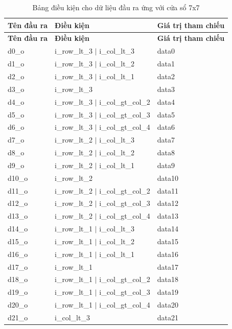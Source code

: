 \begin{longtable}{|p{3cm}|p{8cm}|p{4cm}|}
			\caption{Bảng điều kiện cho dữ liệu đầu ra ứng với cửa sổ 7x7} 
	\hline
	\rowcolor{gray!30}
	\textbf{Tên đầu ra} & \textbf{Điều kiện} & \textbf{Giá trị tham chiếu} \\
	\hline
	\endfirsthead
	
	\hline
	\rowcolor{gray!30}
	\textbf{Tên đầu ra} & \textbf{Điều kiện} & \textbf{Giá trị tham chiếu} \\
	\hline
	\endhead
	d0\_o & i\_row\_lt\_3 $\vert$ i\_col\_lt\_3 & data0 \\
	d1\_o & i\_row\_lt\_3 $\vert$ i\_col\_lt\_2 & data1 \\
	d2\_o & i\_row\_lt\_3 $\vert$ i\_col\_lt\_1 & data2 \\
	d3\_o & i\_row\_lt\_3 & data3 \\
	d4\_o & i\_row\_lt\_3 $\vert$ i\_col\_gt\_col\_2 & data4 \\
	d5\_o & i\_row\_lt\_3 $\vert$ i\_col\_gt\_col\_3 & data5 \\
	d6\_o & i\_row\_lt\_3 $\vert$ i\_col\_gt\_col\_4 & data6 \\
	d7\_o & i\_row\_lt\_2 $\vert$ i\_col\_lt\_3 & data7 \\
	d8\_o & i\_row\_lt\_2 $\vert$ i\_col\_lt\_2 & data8 \\
	d9\_o & i\_row\_lt\_2 $\vert$ i\_col\_lt\_1 & data9 \\
	d10\_o & i\_row\_lt\_2 & data10 \\
	d11\_o & i\_row\_lt\_2 $\vert$ i\_col\_gt\_col\_2 & data11 \\
	d12\_o & i\_row\_lt\_2 $\vert$ i\_col\_gt\_col\_3 & data12 \\
	d13\_o & i\_row\_lt\_2 $\vert$ i\_col\_gt\_col\_4 & data13 \\
	d14\_o & i\_row\_lt\_1 $\vert$ i\_col\_lt\_3 & data14 \\
	d15\_o & i\_row\_lt\_1 $\vert$ i\_col\_lt\_2 & data15 \\
	d16\_o & i\_row\_lt\_1 $\vert$ i\_col\_lt\_1 & data16 \\
	d17\_o & i\_row\_lt\_1 & data17 \\
	d18\_o & i\_row\_lt\_1 $\vert$ i\_col\_gt\_col\_2 & data18 \\
	d19\_o & i\_row\_lt\_1 $\vert$ i\_col\_gt\_col\_3 & data19 \\
	d20\_o & i\_row\_lt\_1 $\vert$ i\_col\_gt\_col\_4 & data20 \\
	d21\_o & i\_col\_lt\_3 & data21 \\

\end{longtable}
